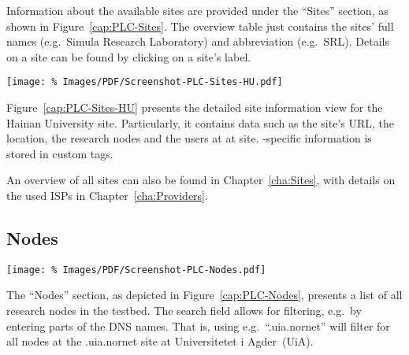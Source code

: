 Information about the available  sites are provided under the ``Sites'' section, as shown in Figure~\ref{cap:PLC-Sites}. The overview table just contains the sites' full names (e.g.\ Simula Research Laboratory) and abbreviation (e.g.\ SRL). Details on a site can be found by clicking on a site's label.

\begin{figure*}
\begin{center}
\texttt{[image: \%
   Images/PDF/Screenshot-PLC-Sites-HU.pdf]}
\end{center}
\caption{Sites $\rightarrow$ Hainan University~(HU)}
\label{cap:PLC-Sites-HU}
\end{figure*}

Figure~\ref{cap:PLC-Sites-HU} presents the detailed site information view for the Hainan University site. Particularly, it contains data such as the site's URL, the location, the research nodes and the users at at site. -specific information is stored in custom tags.

An overview of all  sites can also be found in Chapter~\ref{cha:Sites}, with details on the used ISPs in Chapter~\ref{cha:Providers}.


\subsection{Nodes}
\label{sub:Nodes}

\begin{figure*}
\begin{center}
\texttt{[image: \%
   Images/PDF/Screenshot-PLC-Nodes.pdf]}
\end{center}
\caption{Nodes}
\label{cap:PLC-Nodes}
\end{figure*}

The ``Nodes'' section, as depicted in Figure~\ref{cap:PLC-Nodes}, presents a list of all research nodes in the testbed. The search field allows for filtering, e.g.\ by entering parts of the DNS names. That is, using e.g.\ ``.uia.nornet'' will filter for all nodes at the .uia.nornet site at \foreignlanguage{norsk}{Universitetet i Agder~(UiA)}.

